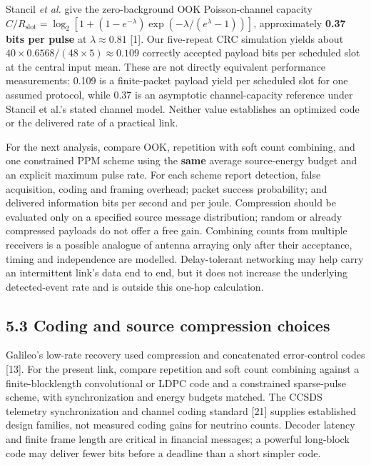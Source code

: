 \documentclass[
]{article}
\begin{document}
Stancil \emph{et al.} give the zero-background OOK Poisson-channel
capacity
\(C/R_{\mathrm{slot}} = \log_2[1 + (1 - e^{-\lambda})\exp(-\lambda/(e^{\lambda} - 1))]\),
approximately \textbf{0.37 bits per pulse} at \(\lambda \approx 0.81\)
{[}1{]}. Our five-repeat CRC simulation yields about
\(40 \times 0.6568/(48 \times 5) \approx 0.109\) correctly accepted
payload bits per scheduled slot at the central input mean. These are not
directly equivalent performance measurements: 0.109 is a finite-packet
payload yield per scheduled slot for one assumed protocol, while 0.37 is
an asymptotic channel-capacity reference under Stancil et al.'s stated
channel model. Neither value establishes an optimized code or the
delivered rate of a practical link.

For the next analysis, compare OOK, repetition with soft count
combining, and one constrained PPM scheme using the \textbf{same}
average source-energy budget and an explicit maximum pulse rate. For
each scheme report detection, false acquisition, coding and framing
overhead; packet success probability; and delivered information bits per
second and per joule. Compression should be evaluated only on a
specified source message distribution; random or already compressed
payloads do not offer a free gain. Combining counts from multiple
receivers is a possible analogue of antenna arraying only after their
acceptance, timing and independence are modelled. Delay-tolerant
networking may help carry an intermittent link's data end to end, but it
does not increase the underlying detected-event rate and is outside this
one-hop calculation.

\hypertarget{coding-and-source-compression-choices}{%
\subsection{5.3 Coding and source compression
choices}\label{coding-and-source-compression-choices}}

Galileo's low-rate recovery used compression and concatenated
error-control codes {[}13{]}. For the present link, compare repetition
and soft count combining against a finite-blocklength convolutional or
LDPC code and a constrained sparse-pulse scheme, with synchronization
and energy budgets matched. The CCSDS telemetry synchronization and
channel coding standard {[}21{]} supplies established design families,
not measured coding gains for neutrino counts. Decoder latency and
finite frame length are critical in financial messages; a powerful
long-block code may deliver fewer bits before a deadline than a short
simpler code.
\end{document}
